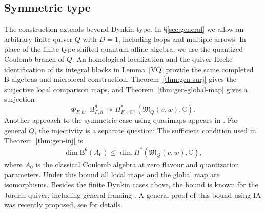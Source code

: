 \documentclass[11pt,reqno]{amsart}
\theoremstyle{definition}
\theoremstyle{remark}
\def\bbC{\mathbb C}
\def\B{\mathrm B}
\def\M{\mathfrak M}
\begin{document}
\subsection{Symmetric type}
The construction extends beyond Dynkin type. In
\S\ref{sec:general} we allow an arbitrary finite quiver $Q$ with
$D=1$, including loops and multiple arrows. In place of the
finite type shifted quantum affine algebra, we use the quantized
Coulomb branch of $Q$. An homological localization and the
quiver Hecke identification of its integral blocks in
Lemma~\ref{VQ} provide the same completed B-algebras and
microlocal construction. Theorem~\ref{thm:gen-surj} gives the
surjective local comparison maps, and
Theorem~\ref{thm:gen-global-map} gives a surjection
\[
 \Phi_{F,\hbar}:\ \B^\theta_{F,\hbar}
 \twoheadrightarrow H^*_{F\times\bbC^\times}
 (\M_Q(v,w),\bbC).
\]
Another approach to the symmetric case using quasimaps  appears in \cite{BT26}.
For general $Q$, the injectivity is a separate question: The sufficient
condition used in Theorem~\ref{thm:gen-inj} is
\begin{align}\label{inequality}
 \dim\B^\theta(A_0)
 \leqslant \dim H^*(\M_Q(v,w),\bbC),
\end{align}
where $A_0$ is the classical Coulomb algebra at zero flavour and
quantization parameters. Under this bound all local maps and the
global map are isomorphisms. Besides the finite Dynkin cases above,
the bound is known for the Jordan quiver, including general framing
\cite{Hik17,KS24}. 
A general proof of this bound using  IA was recently proposed, see \cite{HikNotes} for details.
\end{document}
